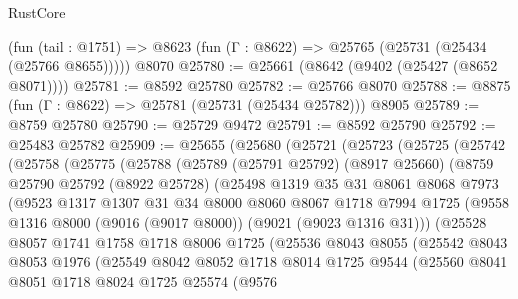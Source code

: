 \begin{lexlean}{RustCore}
\begin{coremodule}
    (fun (tail : @1751) => @8623 (fun (Γ : @8622) => @25765 (@25731 (@25434 (@25766 @8655)))))
    @8070
@25780 := @25661 (@8642 (@9402 (@25427 (@8652 @8071))))
@25781 := @8592 @25780
@25782 := @25766 @8070
@25788 := @8875 (fun (Γ : @8622) => @25781 (@25731 (@25434 @25782))) @8905
@25789 := @8759 @25780
@25790 := @25729 @9472
@25791 := @8592 @25790
@25792 := @25483 @25782
@25909 := @25655
    (@25680
      (@25721
        (@25723
          (@25725
            (@25742
              (@25758
                (@25775
                  (@25788
                    (@25789
                      (@25791 @25792)
                      (@8917 @25660)
                      (@8759
                        @25790
                        @25792
                        (@8922 @25728)
                        (@25498
                          @1319
                          @35
                          @31
                          @8061
                          @8068
                          @7973
                          (@9523
                            @1317
                            @1307
                            @31
                            @34
                            @8000
                            @8060
                            @8067
                            @1718
                            @7994
                            @1725
                            (@9558 @1316 @8000 (@9016 (@9017 @8000)) (@9021 (@9023 @1316 @31)))
                            (@25528
                              @8057
                              @1741
                              @1758
                              @1718
                              @8006
                              @1725
                              (@25536
                                @8043
                                @8055
                                (@25542
                                  @8043
                                  @8053
                                  @1976
                                  (@25549
                                    @8042
                                    @8052
                                    @1718
                                    @8014
                                    @1725
                                    @9544
                                    (@25560
                                      @8041
                                      @8051
                                      @1718
                                      @8024
                                      @1725
                                      @25574
                                      (@9576

\end{coremodule}
\end{lexlean}
